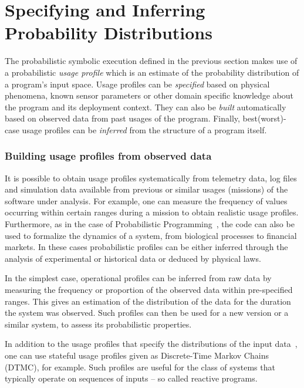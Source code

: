 \section{Specifying and Inferring Probability Distributions}
\label{sec:probspecs}

The probabilistic symbolic execution defined in the previous section
makes use of a probabilistic {\em usage profile} which is an estimate
of the probability distribution of a program's input space.  Usage
profiles can be {\em specified} based on physical phenomena, known
sensor parameters or other domain specific knowledge about the program
and its deployment context.  They can also be {\em built}
automatically based on observed data from past usages of the program.
Finally, best(worst)-case usage profiles can be {\em inferred} from
the structure of a program itself.  

\subsubsection{Building usage profiles from observed data}
It is possible to obtain usage profiles systematically from
telemetry data, log files and simulation
data available from previous or similar usages (missions) of 
the software under analysis.
For example, one can measure
the frequency of values occurring within certain ranges
during a mission to obtain realistic usage profiles. 
Furthermore, as in the case of Probabilistic
Programming~\cite{Gordon2014}, the code can also be
used to formalize the dynamics of a system, from biological processes
to financial markets. In these cases probabilistic profiles can be
either inferred through the analysis of experimental or historical
data or deduced by physical laws.


In the simplest case, operational profiles can be inferred from raw
data by measuring the frequency or proportion of the observed data
within pre-specified ranges.  This gives an estimation of the
distribution of the data for the duration the system was observed.
Such profiles can then be used for a new version or a similar system,
to assess its probabilistic properties.

In addition to the usage profiles that specify the distributions of
the input data~\cite{filieri2013reliability}, one can use stateful usage profiles
given as Discrete-Time Markov Chains (DTMC), for example.  Such
profiles are useful for the class of systems that typically operate on
sequences of inputs -- so called reactive programs.

